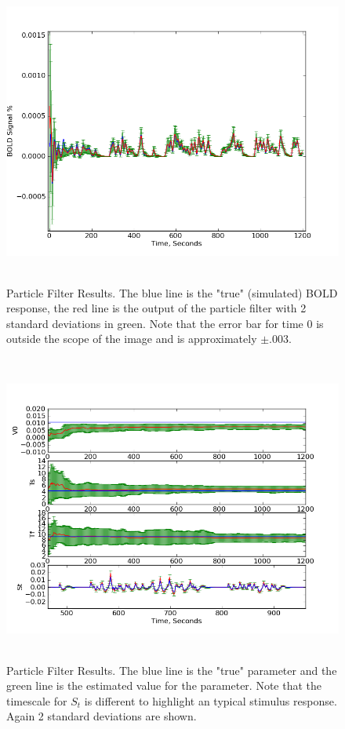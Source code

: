 \documentclass{article}
\begin{document}
\begin{figure}
\includegraphics[width=8in,height=4in]{bold.png}
\caption{Particle Filter Results. The blue line is the "true"
(simulated) BOLD response, the red line
is the output of the particle filter with 2 standard deviations
in green. Note that the error bar for time 0 is outside the scope
of the image and is approximately $\pm .003$.}
\label{fig:bold}
\end{figure}

\begin{figure}
\includegraphics[width=8in,height=4in]{state.png}
\caption{Particle Filter Results. The blue line is the "true"
parameter and the green line is the estimated value for the parameter.
Note that the timescale for $S_t$ is different to highlight an typical
stimulus response. Again 2 standard deviations are shown.}
\label{fig:state}
\end{figure}
\end{document}
